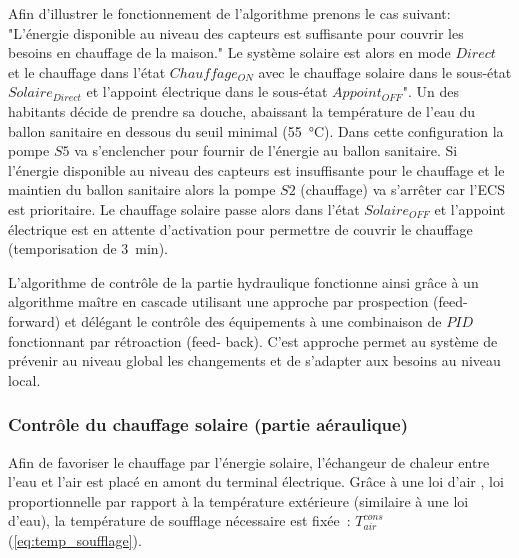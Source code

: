 Afin d’illustrer le fonctionnement de l’algorithme prenons le cas suivant: "L’énergie
disponible au niveau des capteurs est suffisante pour couvrir les besoins en chauffage de
la maison." Le système solaire est alors en mode $Direct$ et le chauffage dans l’état
$Chauffage_{ON}$ avec le chauffage solaire dans le sous-état $Solaire_{Direct}$ et
l’appoint électrique dans le sous-état $Appoint_{OFF}$". Un des habitants décide de
prendre sa douche, abaissant la température de l’eau du ballon sanitaire en dessous du
seuil minimal (\SI{55}{\celsius}). Dans cette configuration la pompe $S5$ va s’enclencher
pour fournir de l’énergie au ballon sanitaire. Si l’énergie disponible au niveau des
capteurs est insuffisante pour le chauffage et le maintien du ballon sanitaire alors la
pompe $S2$ (chauffage) va s’arrêter car l’ECS est prioritaire. Le chauffage solaire passe
alors dans l’état $Solaire_{OFF}$ et l’appoint électrique est en attente d’activation pour
permettre de couvrir le chauffage (temporisation de \SI{3}{\minute}).


L’algorithme de contrôle de la partie hydraulique fonctionne ainsi grâce à un algorithme
maître en cascade utilisant une approche par prospection (feed-forward) et délégant le
contrôle des équipements à une combinaison de $PID$ fonctionnant par rétroaction (feed-
back). C’est approche permet au système de prévenir au niveau global les changements et de
s’adapter aux besoins au niveau local.


\subsubsection{Contrôle du chauffage solaire (partie aéraulique)} %
\label{ssub:controle_du_chauffage_solaire}
Afin de favoriser le chauffage par l’énergie solaire, l’échangeur de chaleur entre l’eau
et l’air est placé en amont du terminal électrique. Grâce à une loi d’air , loi
proportionnelle par rapport à la température extérieure (similaire à une loi d’eau), la
température de soufflage nécessaire est fixée~: $T_{air}^{cons}$ (\autoref{eq:temp_soufflage}).

